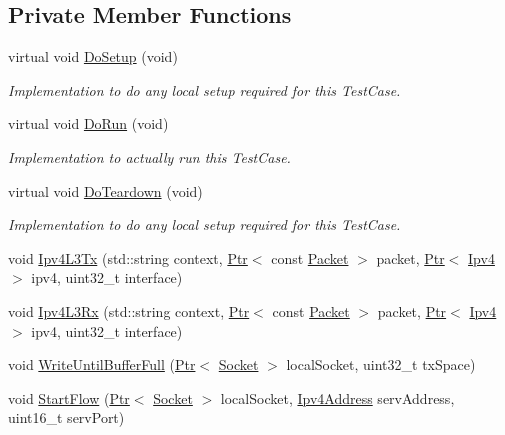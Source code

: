 \subsection*{Private Member Functions}
\begin{DoxyCompactItemize}
\item 
virtual void \hyperlink{classNs3TcpStateTestCase_ab40bcdfe18d73d1d52edf573894ce112}{Do\+Setup} (void)
\begin{DoxyCompactList}\small\item\em Implementation to do any local setup required for this Test\+Case. \end{DoxyCompactList}\item 
virtual void \hyperlink{classNs3TcpStateTestCase_a62dd7855d89e540bf08e8ac2e9febf9f}{Do\+Run} (void)
\begin{DoxyCompactList}\small\item\em Implementation to actually run this Test\+Case. \end{DoxyCompactList}\item 
virtual void \hyperlink{classNs3TcpStateTestCase_a80c9b357d0d42b443efe4feb204c9846}{Do\+Teardown} (void)
\begin{DoxyCompactList}\small\item\em Implementation to do any local setup required for this Test\+Case. \end{DoxyCompactList}\item 
void \hyperlink{classNs3TcpStateTestCase_a35f15c824c1f3ac84ad6e0b1a984a39d}{Ipv4\+L3\+Tx} (std\+::string context, \hyperlink{classns3_1_1Ptr}{Ptr}$<$ const \hyperlink{classns3_1_1Packet}{Packet} $>$ packet, \hyperlink{classns3_1_1Ptr}{Ptr}$<$ \hyperlink{classns3_1_1Ipv4}{Ipv4} $>$ ipv4, uint32\+\_\+t interface)
\item 
void \hyperlink{classNs3TcpStateTestCase_a89479df985ad5aba35cc35cbcf8feefe}{Ipv4\+L3\+Rx} (std\+::string context, \hyperlink{classns3_1_1Ptr}{Ptr}$<$ const \hyperlink{classns3_1_1Packet}{Packet} $>$ packet, \hyperlink{classns3_1_1Ptr}{Ptr}$<$ \hyperlink{classns3_1_1Ipv4}{Ipv4} $>$ ipv4, uint32\+\_\+t interface)
\item 
void \hyperlink{classNs3TcpStateTestCase_ab52f727ef7454eae1f4a6a5a491c019a}{Write\+Until\+Buffer\+Full} (\hyperlink{classns3_1_1Ptr}{Ptr}$<$ \hyperlink{classns3_1_1Socket}{Socket} $>$ local\+Socket, uint32\+\_\+t tx\+Space)
\item 
void \hyperlink{classNs3TcpStateTestCase_a27240502909a83e4ca4895a96986ea98}{Start\+Flow} (\hyperlink{classns3_1_1Ptr}{Ptr}$<$ \hyperlink{classns3_1_1Socket}{Socket} $>$ local\+Socket, \hyperlink{classns3_1_1Ipv4Address}{Ipv4\+Address} serv\+Address, uint16\+\_\+t serv\+Port)
\end{DoxyCompactItemize}
